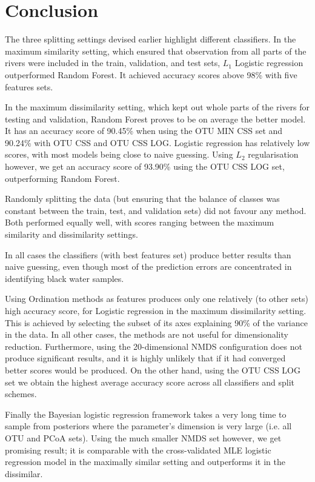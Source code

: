 
\chapter{Conclusion}
The three splitting settings devised earlier highlight different classifiers. 
In the maximum similarity setting, which ensured that observation from all parts of the rivers were included in the train, validation, and test sets, $L_1$ Logistic regression outperformed Random Forest. It achieved accuracy scores above 98\% with five features sets. 

In the maximum dissimilarity setting, which kept out whole parts of the rivers for testing and validation, Random Forest proves to be on average the better model. It has an accuracy score of 90.45\% when using the OTU MIN CSS set and 90.24\% with OTU CSS and OTU CSS LOG. Logistic regression has relatively low scores, with most models being close to naive guessing. Using $L_2$ regularisation however, we get an accuracy score of 93.90\% using the OTU CSS LOG set, outperforming Random Forest.

Randomly splitting the data (but ensuring that the balance of classes was constant between the train, test, and validation sets) did not favour any method. Both performed equally well, with scores ranging between the maximum similarity and dissimilarity settings.

In all cases the classifiers (with best features set) produce better results than naive guessing, even though most of the prediction errors are concentrated in identifying black water samples. 

Using Ordination methods as features produces only one relatively (to other sets) high accuracy score, for Logistic regression in the maximum dissimilarity setting. This is achieved by selecting the subset of its axes explaining 90\% of the variance in the data. In all other cases, the methods are not useful for dimensionality reduction. Furthermore, using the 20-dimensional NMDS configuration does not produce significant results, and it is highly unlikely that if it had converged better scores would be produced. On the other hand, using the OTU CSS LOG set we obtain the highest average accuracy score across all classifiers and split schemes. 


Finally the Bayesian logistic regression framework takes a very long time to sample from posteriors where the parameter's dimension is very large (i.e. all OTU and PCoA sets). Using the much smaller NMDS set however, we get promising result; it is comparable with the cross-validated MLE logistic regression model in the maximally similar setting and outperforms it in the dissimilar. 


